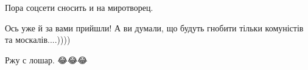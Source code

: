 \begin{itemize}
Пора соцсети сносить и на миротворец.

 
Ось уже й за вами прийшли! А ви думали, що будуть гнобити тільки комуністів та москалів....))))

 
Ржу с лошар. 😂😂😂

\end{itemize}

